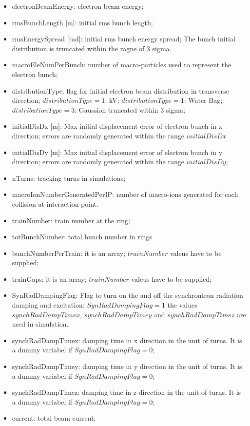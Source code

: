 \documentclass[aps,prab,reprint,superscriptaddress,showpacs,showkeys,letter]{revtex4-1}
\begin{document}
\begin{itemize}
\item electronBeamEnergy: electron beam energy;
\item rmsBunchLength [m]: initial rms bunch length;
\item rmsEnergySpread [rad]: initial rms bunch energy spread; The bunch initial distribution is truncated within the ragne of  3 sigma.  
\item macroEleNumPerBunch: number of macro-particles used to represent the electron bunch; 
\item distributionType: flag for initial electron beam distribution in transverse direction; $distributionType=1$: kV; $distributionType=1$: Water Bag; $distributionType=3$: Gaussion truncated within 3 sigma;
\item initialDisDx [m]: Max initial displacement error of electron bunch in x direction; errors are randomly generated within the range  $initialDisDx$
\item initialDisDy [m]: Max initial displacement error of electron bunch in y direction; errors are randomly generated within the range  $initialDisDy$;
\item nTurns: tracking turns in simulations;
\item macroIonNumberGeneratedPerIP: number of macro-ions generated for each collision at interaction point.
\item trainNumber: train number at the ring; 
\item totBunchNumber: total bunch number in rings
\item bunchNumberPerTrain: it is an array; $trainNumber$ valeus have to be supplied; 
\item trainGaps:  it is an array; $trainNumber$ valeus have to be supplied;
\item SynRadDampingFlag: Flag to turn on the and off the synchrontron radiation damping and excitation; $SynRadDampingFlag=1$ the values $synchRadDampTimex$, $synchRadDampTimey$ and $synchRadDampTimez$ are used in simulation. 
\item synchRadDampTimex: damping time in x direction in the unit of turns. It is a dummy variabel if $SynRadDampingFlag=0$;
\item synchRadDampTimey: damping time in y direction in the unit of turns.  It is a dummy variabel if $SynRadDampingFlag=0$;
\item synchRadDampTimez: damping time in z direction in the unit of turns.  It is a dummy variabel if $SynRadDampingFlag=0$;
\item  current: total beam current;

\end{itemize}
\end{document}
